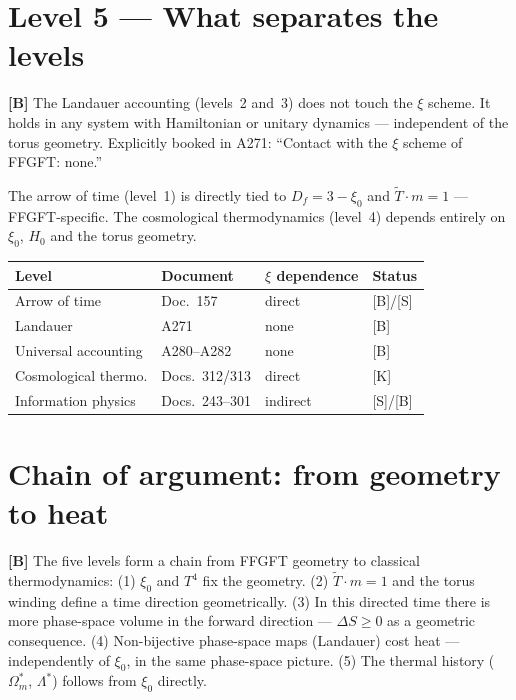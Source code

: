 \section{Level 5 --- What separates the levels}

\textbf{[B]} The Landauer accounting (levels~2 and~3) does not touch
the $\xi$ scheme. It holds in any system with Hamiltonian or unitary
dynamics --- independent of the torus geometry. Explicitly booked in
A271: \enquote{Contact with the $\xi$ scheme of FFGFT: none.}

The arrow of time (level~1) is directly tied to $D_f = 3-\xi_0$ and
$\tilde{T} \cdot m = 1$ --- FFGFT-specific.
The cosmological thermodynamics (level~4) depends entirely on $\xi_0$,
$H_0$ and the torus geometry.

\begin{center}
\small
\begin{tabular}{@{}p{}p{}p{}p{}@{}}
\toprule
\textbf{Level} & \textbf{Document} & \textbf{$\xi$ dependence} & \textbf{Status} \\
\midrule
Arrow of time & Doc.~157 & direct & [B]/[S] \\
Landauer & A271 & none & [B] \\
Universal accounting & A280--A282 & none & [B] \\
Cosmological thermo. & Docs.~312/313 & direct & [K] \\
Information physics & Docs.~243--301 & indirect & [S]/[B] \\
\bottomrule
\end{tabular}
\end{center}

\section{Chain of argument: from geometry to heat}

\textbf{[B]} The five levels form a chain from FFGFT geometry to
classical thermodynamics:
(1) $\xi_0$ and $T^4$ fix the geometry.
(2) $\tilde{T} \cdot m = 1$ and the torus winding define a time
direction geometrically.
(3) In this directed time there is more phase-space volume in the
forward direction --- $\Delta S \ge 0$ as a geometric consequence.
(4) Non-bijective phase-space maps (Landauer) cost heat ---
independently of $\xi_0$, in the same phase-space picture.
(5) The thermal history ($\Omega_m^*$, $\Lambda^*$) follows from
$\xi_0$ directly.

